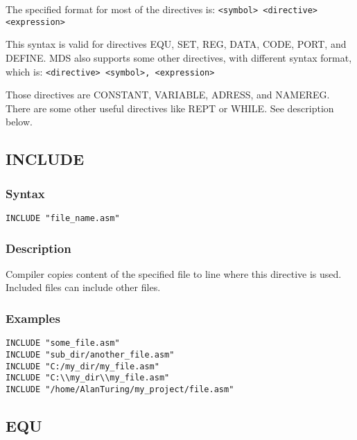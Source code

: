     The specified format for most of the directives is:
    {
        \usecodefont
        \verb'<symbol> <directive> <expression>'
    }

    \bigskip

    This syntax is valid for directives EQU, SET, REG, DATA, CODE, PORT, and DEFINE. MDS also supports some other directives, with different syntax format, which is:
    {
        \usecodefont
        \verb'<directive> <symbol>, <expression>'
    }

    \bigskip

    Those directives are CONSTANT, VARIABLE, ADRESS, and NAMEREG. There are some other useful directives like REPT or WHILE. See description below.

    \clearpage
    \subsection{INCLUDE}
        \subsubsection{Syntax}
        {
            \usecodefont
            \verb'INCLUDE "file_name.asm"'
        }

        \subsubsection{Description}
            Compiler copies content of the specified file to line where this directive is used. Included files can include other files.

        \subsubsection{Examples}
        {
            \usecodefont
            \verb'INCLUDE "some_file.asm"'\\
            \verb'INCLUDE "sub_dir/another_file.asm"'\\
            \verb'INCLUDE "C:/my_dir/my_file.asm"'\\
            \verb'INCLUDE "C:\\my_dir\\my_file.asm"'\\
            \verb'INCLUDE "/home/AlanTuring/my_project/file.asm"'\\
        }

    \subsection{EQU}
